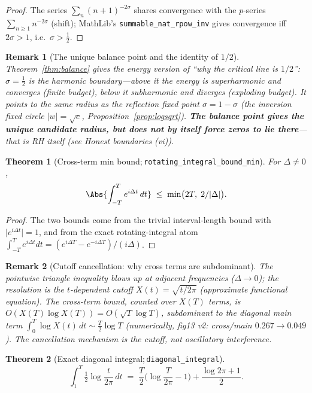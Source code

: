 \documentclass[submission]{jsfds}
\newtheorem{theorem}{Theorem}
\newtheorem*{remark}{Remark}
\newcommand{\Lean}[1]{\texttt{#1}}
\newcommand{\abs}[1]{\lvert #1\rvert}
\begin{document}
\begin{proof}
The series $\sum_n (n+1)^{-2\sigma}$ shares convergence with the $p$-series
$\sum_{n\geq1} n^{-2\sigma}$ (shift); MathLib's \Lean{summable_nat_rpow_inv}
gives convergence iff $2\sigma>1$, i.e.\ $\sigma>\tfrac12$.
\end{proof}

\begin{remark}[The unique balance point and the identity of $1/2$]\label{remark:balance}
Theorem~\ref{thm:balance} gives the \emph{energy} version of ``why the
critical line is $1/2$'': $\sigma=\tfrac12$ is the harmonic boundary---above
it the energy is superharmonic and converges (finite budget), below it
subharmonic and diverges (exploding budget). It points to the same radius as
the reflection fixed point $\sigma=1-\sigma$ (the inversion fixed circle
$\abs{w}=\sqrt{e}$, Proposition~\ref{prop:logsqrt}). \textbf{The balance
point gives the unique candidate radius, but does not by itself force zeros
to lie there}---that is RH itself (see Honest boundaries (vi)).
\end{remark}

\begin{theorem}[Cross-term min bound;\,\Lean{rotating_integral_bound_min}]
\label{thm:crossmin}
For $\Delta\neq 0$,
\[
  \Abs{\int_{-T}^{T} e^{i\Delta t}\,dt} \;\leq\; \min\!\big(2T,\; 2/\abs{\Delta}\big) .
\]
\end{theorem}

\begin{proof}
The two bounds come from the trivial interval-length bound with
$\abs{e^{i\Delta t}}=1$, and from the exact rotating-integral atom
$\int_{-T}^{T}e^{i\Delta t}dt=(e^{i\Delta T}-e^{-i\Delta T})/(i\Delta)$.
\end{proof}

\begin{remark}[Cutoff cancellation: why cross terms are subdominant]\label{remark:cutoff}
The pointwise triangle inequality blows up at adjacent frequencies
($\Delta\to 0$); the resolution is the $t$-dependent cutoff
$X(t)=\sqrt{t/2\pi}$ (approximate functional equation). The cross-term bound,
counted over $X(T)$ terms, is $O(X(T)\log X(T))=O(\sqrt{T}\log T)$,
subdominant to the diagonal main term $\int_0^T \log X(t)\,dt\sim
\tfrac{T}{2}\log T$ (numerically, fig13 v2: cross/main $0.267\to0.049$).
The cancellation mechanism is the \emph{cutoff}, not oscillatory interference.
\end{remark}

\begin{theorem}[Exact diagonal integral;\,\Lean{diagonal_integral}]
\label{thm:diagint}
\[
  \int_{1}^{T} \tfrac12 \log \frac{t}{2\pi}\,dt
    \;=\; \frac{T}{2}\Big(\log\frac{T}{2\pi}-1\Big) + \frac{\log 2\pi+1}{2} .
\]
\end{theorem}
\end{document}
